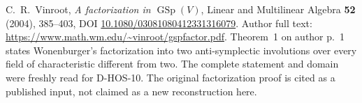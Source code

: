 C.~R.~Vinroot, \emph{A factorization in $\operatorname{GSp}(V)$},
Linear and Multilinear Algebra \textbf{52} (2004), 385--403,
DOI \href{https://doi.org/10.1080/03081080412331316079}
{10.1080/03081080412331316079}.
Author full text: \url{https://www.math.wm.edu/~vinroot/gspfactor.pdf}.
Theorem~1 on author p.~1 states Wonenburger's factorization into
two anti-symplectic involutions over every field of characteristic
different from two. The complete statement and domain were freshly
read for D-HOS-10. The original factorization proof is cited as a
published input, not claimed as a new reconstruction here.

